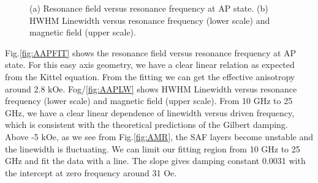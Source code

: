 \begin{figure}[!ht]
\centering
{}
\caption{(a) Resonance field versus resonance frequency at AP state. (b) HWHM Linewidth versus resonance frequency (lower scale) and magnetic field (upper scale).}
\end{figure}

Fig.\ref{fig:AAPFIT} shows the resonance field versus resonance frequency at AP state. For this easy axis geometry, we have a clear linear relation as expected from the Kittel equation. From the fitting we can get the effective anisotropy around 2.8 kOe. Fog/\ref{fig:AAPLW} shows HWHM Linewidth versus resonance frequency (lower scale) and magnetic field (upper scale). From 10 GHz to 25 GHz, we have a clear linear dependence of linewidth versus driven frequency, which is consistent with the theoretical predictions of the Gilbert damping. Above -5 kOe, as we see from Fig.\ref{fig:AMR}, the SAF layers become unstable and the linewidth is fluctuating. We can limit our fitting region from 10 GHz to 25 GHz and fit the data with a line. The slope gives damping constant 0.0031 with the intercept at zero frequency around 31 Oe.

